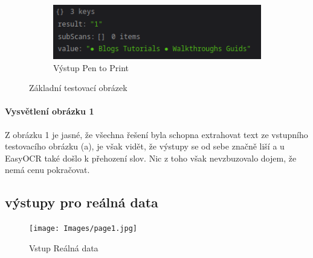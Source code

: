 \documentclass[journal]{IEEEtran}
\begin{document}
\begin{figure}
\begin{subfigure}{\linewidth}
        \centering
        \includegraphics[width=\linewidth]{Images/penToPrint_Test.png}
        \caption{Výstup Pen to Print}
        \label{fig:penToPrint_Test}
\end{subfigure}
\caption{Základní testovací obrázek}

\end{figure}

\paragraph{Vysvětlení obrázku 1}
Z obrázku 1 je jasné, že všechna řešení byla schopna extrahovat text ze vstupního testovacího obrázku (a), je však vidět, že výstupy se od sebe značně liší a u EasyOCR také došlo k přehození slov. Nic z toho však nevzbuzovalo dojem, že nemá cenu pokračovat.


\subsection{výstupy pro reálná data}

\begin{figure}{\linewidth}
        \centering
        \texttt{[image: Images/page1.jpg]}
        \caption{Vstup Reálná data}
        \label{fig:Test}
\end{figure}
\end{document}
